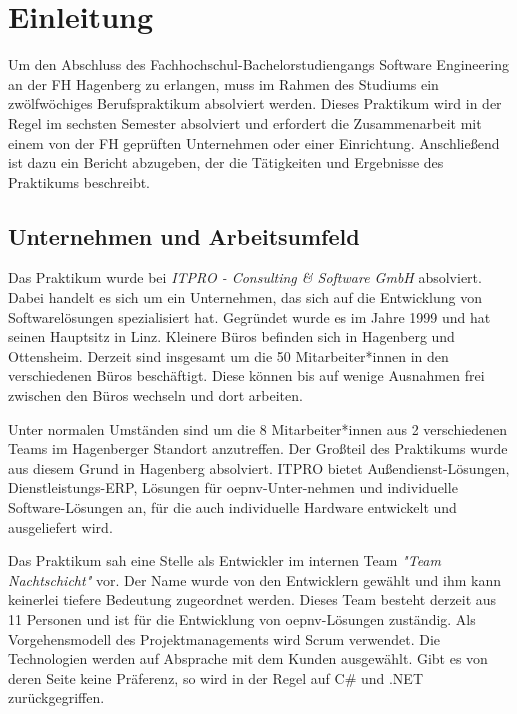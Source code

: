 \chapter{Einleitung}
\label{chap:einleitung}
    Um den Abschluss des Fachhochschul-Bachelorstudiengangs Software Engineering an
    der FH Hagenberg zu erlangen, muss im Rahmen des Studiums ein zwölfwöchiges Berufspraktikum absolviert werden. Dieses Praktikum wird in der Regel im sechsten
     Semester absolviert und erfordert die Zusammenarbeit mit einem von der FH geprüften
    Unternehmen oder einer Einrichtung. Anschließend ist dazu ein Bericht abzugeben, der
    die Tätigkeiten und Ergebnisse des Praktikums beschreibt.

\section{Unternehmen und Arbeitsumfeld}\label{sec:unternehmen-und-arbeitsumfeld}
    Das Praktikum wurde bei \emph{ITPRO - Consulting \& Software GmbH} \cite{ITPRO} absolviert. Dabei handelt es sich um ein Unternehmen, das sich auf die Entwicklung von Softwarelösungen 
    spezialisiert hat. Gegründet wurde es im Jahre 1999 und hat seinen Hauptsitz in Linz. Kleinere Büros befinden sich in Hagenberg und Ottensheim. Derzeit sind insgesamt um die 
    50 Mitarbeiter*innen in den verschiedenen Büros beschäftigt. Diese können bis auf wenige Ausnahmen frei zwischen den Büros wechseln und dort arbeiten. 
    
    Unter normalen Umständen sind um die 8 Mitarbeiter*innen  aus 2 verschiedenen Teams im Hagenberger Standort anzutreffen.
    Der Großteil des Praktikums wurde aus diesem Grund in Hagenberg absolviert.
    ITPRO bietet Außendienst-Lösungen, Dienstleistungs-ERP, Lösungen für \gls{oepnv}-Unter-nehmen und individuelle Software-Lösungen an, für die auch individuelle Hardware entwickelt
    und ausgeliefert wird.

    Das Praktikum sah eine Stelle als Entwickler im internen Team \emph{"Team Nachtschicht"} vor. Der Name wurde von den Entwicklern gewählt und ihm kann keinerlei tiefere Bedeutung zugeordnet werden.
    Dieses Team besteht derzeit aus 11 Personen und ist für die Entwicklung 
    von \gls{oepnv}-Lösungen zuständig. Als Vorgehensmodell des Projektmanagements wird Scrum verwendet. Die Technologien werden auf Absprache mit dem Kunden ausgewählt. Gibt es von deren Seite keine
    Präferenz, so wird in der Regel auf C\# und .NET zurückgegriffen.

